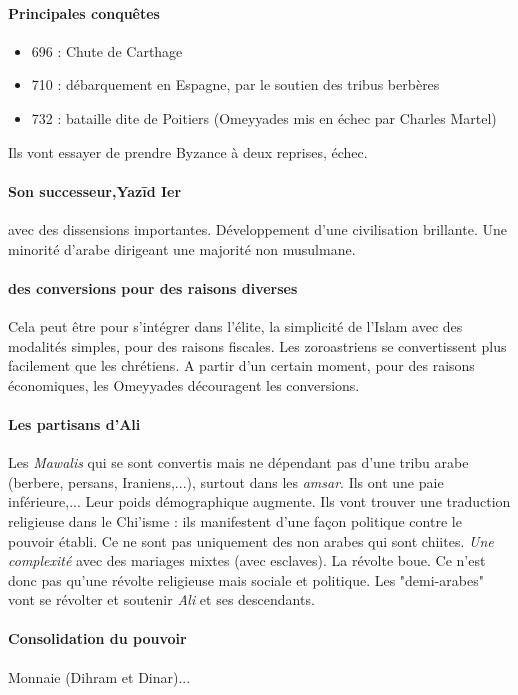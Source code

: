 \paragraph{Principales conquêtes}
\begin{itemize}
   \item 	696 : Chute de Carthage
\item 	710 : débarquement en Espagne, par le soutien des tribus berbères
\item 	732 : bataille dite de Poitiers (Omeyyades mis en échec par Charles Martel)
\end{itemize}
Ils vont essayer de prendre Byzance à deux reprises, échec.

\paragraph{Son successeur,Yazīd Ier} avec des dissensions importantes. Développement d'une civilisation brillante. Une minorité d'arabe dirigeant une majorité non musulmane.

\paragraph{des conversions pour des raisons diverses} Cela peut être pour s'intégrer dans l'élite, la simplicité de l'Islam avec des modalités simples, pour des raisons fiscales. Les zoroastriens se convertissent plus facilement que les chrétiens. 
A partir d'un certain moment, pour des raisons économiques, les Omeyyades découragent les conversions. 

\paragraph{Les partisans d'Ali} Les \textit{Mawalis} qui se sont convertis mais ne dépendant pas d'une tribu arabe (berbere, persans, Iraniens,...), surtout dans les \textit{amsar}. Ils ont une paie inférieure,... Leur poids démographique augmente. Ils vont trouver une traduction religieuse dans le Chi'isme : ils manifestent d'une façon politique contre le pouvoir établi. Ce ne sont pas uniquement des non arabes qui sont chiites. \textit{Une complexité} avec des mariages mixtes (avec esclaves). La révolte boue. 
Ce n'est donc pas qu'une révolte religieuse mais sociale et politique. Les "demi-arabes" vont se révolter et soutenir \textit{Ali} et ses descendants. 

\paragraph{Consolidation du pouvoir} Monnaie (Dihram et Dinar)... 


